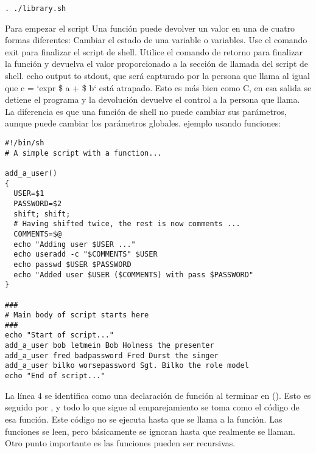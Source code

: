 \documentclass{article}
\begin{document}
\begin{verbatim}
. ./library.sh
\end{verbatim}
Para empezar el script
Una función puede devolver un valor en una de cuatro formas diferentes:
\newline
Cambiar el estado de una variable o variables.
\newline
Use el comando exit para finalizar el script de shell.
\newline
Utilice el comando de retorno para finalizar la función y devuelva el valor proporcionado a la sección de llamada del script de shell.
\newline
echo output to stdout, que será capturado por la persona que llama al igual que c = `expr \$ a + \$ b` está atrapado.
\newline
Esto es más bien como C, en esa salida se detiene el programa y la devolución devuelve el control a la persona que llama. La diferencia es que una función de shell no puede cambiar sus parámetros, aunque puede cambiar los parámetros globales.
\newline
ejemplo usando funciones:
\begin{verbatim}
#!/bin/sh
# A simple script with a function...

add_a_user()
{
  USER=$1
  PASSWORD=$2
  shift; shift;
  # Having shifted twice, the rest is now comments ...
  COMMENTS=$@
  echo "Adding user $USER ..."
  echo useradd -c "$COMMENTS" $USER
  echo passwd $USER $PASSWORD
  echo "Added user $USER ($COMMENTS) with pass $PASSWORD"
}

###
# Main body of script starts here
###
echo "Start of script..."
add_a_user bob letmein Bob Holness the presenter
add_a_user fred badpassword Fred Durst the singer
add_a_user bilko worsepassword Sgt. Bilko the role model
echo "End of script..."
\end{verbatim}
La línea 4 se identifica como una declaración de función al terminar en (). Esto es seguido por {, y todo lo que sigue al emparejamiento} se toma como el código de esa función.
Este código no se ejecuta hasta que se llama a la función. Las funciones se leen, pero básicamente se ignoran hasta que realmente se llaman.
Otro punto importante es las funciones pueden ser recursivas.
\end{document}
